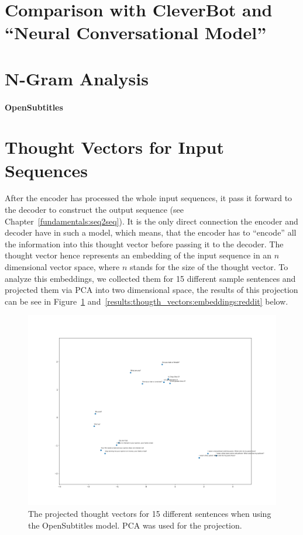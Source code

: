 \section{Comparison with CleverBot and ``Neural Conversational Model''}
\blindtext

\section{N-Gram Analysis}

\paragraph{OpenSubtitles} \blindtext


\section{Thought Vectors for Input Sequences}
After the encoder has processed the whole input sequences, it pass it forward to the decoder to construct the output sequence (see Chapter~\ref{fundamentals:seq2seq}). It is the only direct connection the encoder and decoder have in such a model, which means, that the encoder has to ``encode'' all the information into this thought vector before passing it to the decoder. The thought vector hence represents an embedding of the input sequence in an $n$ dimensional vector space, where $n$ stands for the size of the thought vector. To analyze this embeddings, we collected them for 15 different sample sentences and projected them via PCA into two dimensional space, the results of this projection can be see in Figure~\ref{results:thougth_vectors:embeddings:opensubtitles} and~\ref{results:thougth_vectors:embeddings:reddit} below.

\begin{figure}[H]
	\centering
	\includegraphics[width=16cm]{img/opensubtitles_thought_vector_embeddings.png}
	\caption{The projected thought vectors for 15 different sentences when using the OpenSubtitles model. PCA was used for the projection.}
	\label{results:thougth_vectors:embeddings:opensubtitles}
\end{figure}


